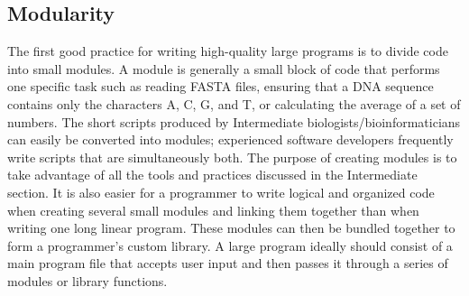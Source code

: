 \documentclass[ChapterTOCs,krantz2]{krantz} %
\begin{document}
\subsection{Modularity}

The first good practice for writing high-quality large programs is to divide
code into small modules.  A module is generally a small block of code that
performs one specific task such as reading FASTA files, ensuring that a DNA
sequence contains only the characters A, C, G, and T, or calculating the
average of a set of numbers.  The short scripts produced by Intermediate
biologists/bioinformaticians can easily be converted into modules; experienced
software developers frequently write scripts that are simultaneously both.  
The purpose of creating modules is to take
advantage of all the tools and practices discussed in the Intermediate section.  
It is also easier for a programmer to write logical and organized
code when creating several small modules and linking them together than when
writing one long linear program.  These modules can then be bundled together to
form a programmer's custom library.  A large program ideally should consist of
a main program file that accepts user input and then passes it through a series
of modules or library functions.  
\end{document}
